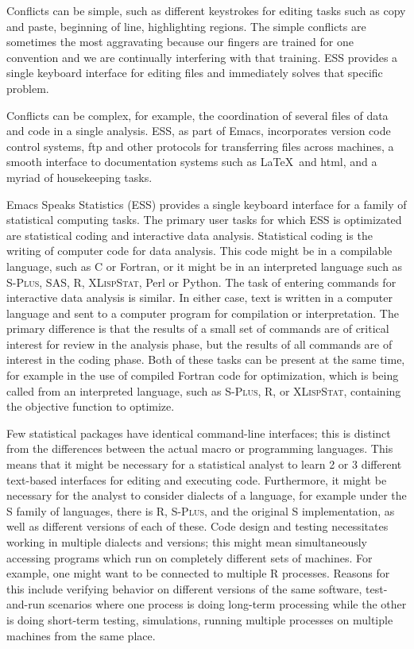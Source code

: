 \documentclass{article}
\newcommand*{\Splus}{\textsc{S-Plus}}
\newcommand*{\XLispStat}{\textsc{XLispStat}}
\begin{document}
Conflicts can be simple, such as different keystrokes for editing
tasks such as copy and paste, beginning of line, highlighting
regions. The simple conflicts are sometimes the most aggravating
because our fingers are trained for one convention and we are
continually interfering with that training.
ESS provides a single keyboard interface for editing files and
immediately solves that specific problem.


Conflicts can be complex, for example, the coordination of several
files of data and code in a single analysis.  ESS, as part of Emacs,
incorporates version code control systems, ftp and other protocols for
transferring files across machines, a smooth interface to
documentation systems such as \LaTeX\ and html, and a myriad of
housekeeping tasks.

Emacs Speaks Statistics (ESS) provides a single keyboard interface for
a family of statistical computing tasks.  The primary user tasks for which
ESS is optimizated are statistical coding
and interactive data analysis.  Statistical coding is the writing of
computer code for data analysis.  This code might be in a compilable
language, such as C or Fortran, or it might be in an interpreted
language such as \Splus, SAS, R, \XLispStat, Perl or Python.  The task
of entering commands for interactive data analysis is similar.  In
either case, text is written in a computer language and sent to a
computer program for compilation or interpretation.  The primary
difference is that the results of a small set of commands are of
critical interest for review in the analysis phase, but the results of
all commands are of interest in the coding phase.  Both of these tasks
can be present at the same time, for example in the use of compiled
Fortran code for optimization, which is being called from an
interpreted language, such as \Splus, R, or \XLispStat, containing the
objective function to optimize.

Few statistical packages have identical command-line interfaces; this
is distinct from the differences between the actual macro or
programming languages.  This means that it might be necessary for a
statistical analyst to learn 2 or 3 different text-based interfaces
for editing and executing code.  Furthermore, it might be necessary
for the analyst to consider dialects of a language, for example under
the S family of languages, there is R, \Splus, and the original S
implementation, as well as different versions of each of these.  Code
design and testing necessitates working in multiple dialects and
versions; this might mean simultaneously accessing programs which run
on completely different sets of machines.  For example, one might want
to be connected to multiple R processes.  Reasons for this include
verifying behavior on different versions of the same software,
test-and-run scenarios where one process is doing long-term processing
while the other is doing short-term testing, simulations, running
multiple processes on multiple machines from the same place.
\end{document}
